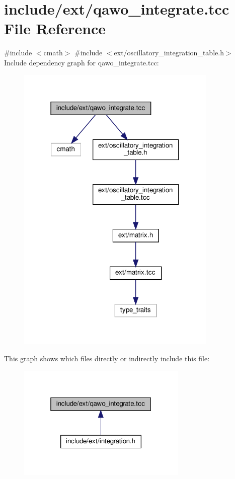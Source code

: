 \hypertarget{qawo__integrate_8tcc}{}\section{include/ext/qawo\+\_\+integrate.tcc File Reference}
\label{qawo__integrate_8tcc}
{\ttfamily \#include $<$cmath$>$}\newline
{\ttfamily \#include $<$ext/oscillatory\+\_\+integration\+\_\+table.\+h$>$}\newline
Include dependency graph for qawo\+\_\+integrate.\+tcc\+:
\nopagebreak
\begin{figure}[H]
\begin{center}
\leavevmode
\includegraphics[width=271pt]{qawo__integrate_8tcc__incl}
\end{center}
\end{figure}
This graph shows which files directly or indirectly include this file\+:
\nopagebreak
\begin{figure}[H]
\begin{center}
\leavevmode
\includegraphics[width=229pt]{qawo__integrate_8tcc__dep__incl}
\end{center}
\end{figure}
